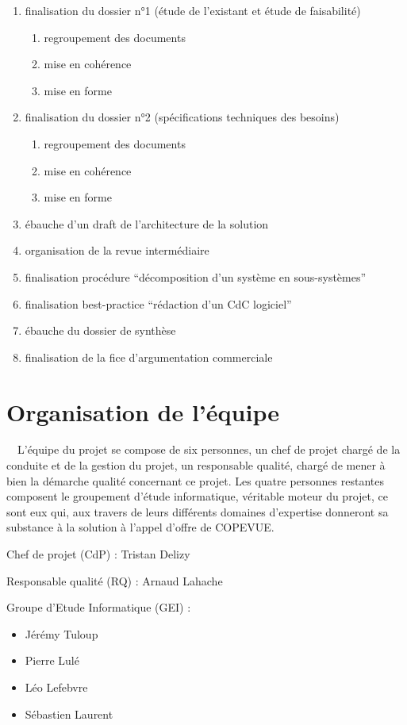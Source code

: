 \documentclass{mise_en_page}
\begin{document}
\begin{enumerate}
\item finalisation du dossier n°1 (étude de l’existant et étude de
faisabilité)

\begin{enumerate}
\item regroupement des documents
\item mise en cohérence
\item mise en forme
\end{enumerate}
\item finalisation du dossier n°2 (spécifications techniques des
besoins)

\begin{enumerate}
\item regroupement des documents
\item mise en cohérence
\item mise en forme
\end{enumerate}
\item ébauche d’un draft de l’architecture de la solution
\item organisation de la revue intermédiaire
\item finalisation procédure “décomposition d’un système en
sous-systèmes”
\item finalisation best-practice “rédaction d’un CdC logiciel”
\item ébauche du dossier de synthèse
\item finalisation de la fice d’argumentation commerciale
\end{enumerate}
\section{Organisation de l’équipe}
\ \ L’équipe du projet se compose de six personnes, un chef de projet
chargé de la conduite et de la gestion du projet, un responsable
qualité, chargé de mener à bien la démarche qualité concernant ce
projet. Les quatre personnes restantes composent le groupement d’étude
informatique, véritable moteur du projet, ce sont eux qui, aux travers
de leurs différents domaines d’expertise donneront sa substance à la
solution à l’appel d’offre de COPEVUE.

Chef de projet (CdP) : Tristan Delizy

Responsable qualité (RQ) : Arnaud Lahache

Groupe d’Etude Informatique (GEI) :  

\begin{itemize}
\item Jérémy Tuloup
\item Pierre Lulé
\item Léo Lefebvre
\item Sébastien Laurent
\end{itemize}
\end{document}
